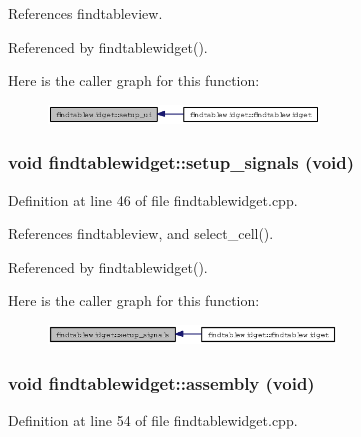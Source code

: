 References findtableview.

Referenced by findtablewidget().

Here is the caller graph for this function:\begin{figure}[H]
\begin{center}
\leavevmode
\includegraphics[width=204pt]{classfindtablewidget_a9a60fc112c853da5d244d2ef826ae80_icgraph}
\end{center}
\end{figure}
\subsubsection{\setlength{\rightskip}{0pt plus 5cm}void findtablewidget::setup\_\-signals (void)\hspace{0.3cm}{\tt  [private]}}\label{classfindtablewidget_e2b71d3917571b2d4558ebaa1fd382b9}




Definition at line 46 of file findtablewidget.cpp.

References findtableview, and select\_\-cell().

Referenced by findtablewidget().

Here is the caller graph for this function:\begin{figure}[H]
\begin{center}
\leavevmode
\includegraphics[width=217pt]{classfindtablewidget_e2b71d3917571b2d4558ebaa1fd382b9_icgraph}
\end{center}
\end{figure}
\subsubsection{\setlength{\rightskip}{0pt plus 5cm}void findtablewidget::assembly (void)\hspace{0.3cm}{\tt  [private]}}\label{classfindtablewidget_ce0d13010998778d2d9b18a76a66442d}




Definition at line 54 of file findtablewidget.cpp.

